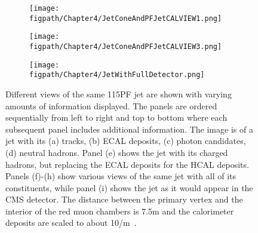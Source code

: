 \begin{figure}[!hbt]
    \begin{subfigure}[t]{0.32\textwidth}
        \texttt{[image: \\figpath/Chapter4/JetConeAndPFJetCALVIEW1.png]}
        \caption{}
        \label{fig:jc_PFjet1}
    \end{subfigure}
    \begin{subfigure}[t]{0.32\textwidth}
        \texttt{[image: \\figpath/Chapter4/JetConeAndPFJetCALVIEW3.png]}
        \caption{}
        \label{fig:jc_PFJet3}
    \end{subfigure}
    \begin{subfigure}[t]{0.32\textwidth}
        \texttt{[image: \\figpath/Chapter4/JetWithFullDetector.png]}
        \caption{}
        \label{fig:jet_fullDetector}
    \end{subfigure}
    \caption{Different views of the same 115\gev PF jet are shown with varying amounts of information displayed. The panels are ordered sequentially from left to right and top to bottom where each subsequent panel includes additional information. The image is of a jet with its (a) tracks, (b) ECAL deposits, (c) photon candidates, (d) neutral hadrons. Panel (e) shows the jet with its charged hadrons, but replacing the ECAL deposits for the HCAL deposits. Panels (f)-(h) show various views of the same jet with all of its constituents, while panel (i) shows the jet as it would appear in the CMS detector. The distance between the primary vertex and the interior of the red muon chambers is 7.5\unit{m} and the calorimeter deposits are scaled to about 10\unit{\gev/m}~\cite{Dorney2014}.}
    \label{fig:BuildingAPFJet}
\end{figure}

